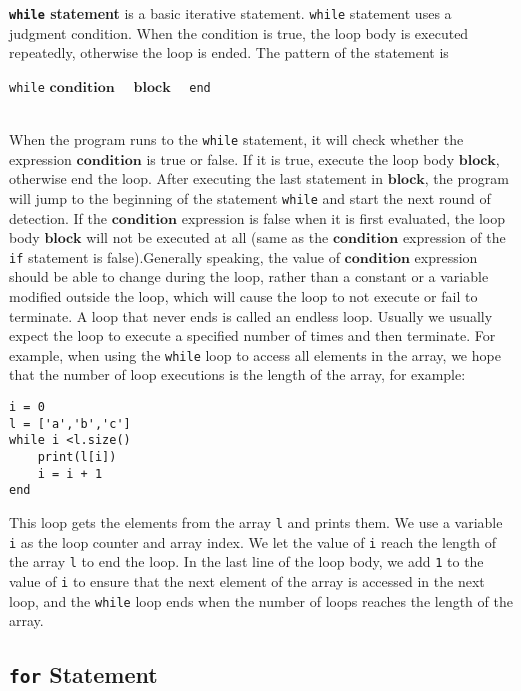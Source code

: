 \textbf{\texttt{while} statement} is a basic iterative statement. \texttt{while} statement uses a judgment condition. When the condition is true, the loop body is executed repeatedly, otherwise the loop is ended. The pattern of the statement is
\begin{algorithm}
    \texttt{while} $\bm{condition}$ \ \
        \qquad $\bm{block}$ \ \
    \texttt{end}
\end{algorithm}\vspace{-0.6em}\\
When the program runs to the \texttt{while} statement, it will check whether the expression $\bm{condition}$ is true or false. If it is true, execute the loop body $\bm{block}$, otherwise end the loop. After executing the last statement in $\bm{block}$, the program will jump to the beginning of the statement \texttt{while} and start the next round of detection. If the $\bm{condition}$ expression is false when it is first evaluated, the loop body $\bm{block}$ will not be executed at all (same as the $\bm{condition}$ expression of the \texttt{if} statement is false).Generally speaking, the value of $\bm{condition}$ expression should be able to change during the loop, rather than a constant or a variable modified outside the loop, which will cause the loop to not execute or fail to terminate. A loop that never ends is called an endless loop. Usually we usually expect the loop to execute a specified number of times and then terminate. For example, when using the \texttt{while} loop to access all elements in the array, we hope that the number of loop executions is the length of the array, for example:
\begin{lstlisting}[language=berry, numbers=none]
i = 0
l = ['a','b','c']
while i <l.size()
    print(l[i])
    i = i + 1
end
\end{lstlisting}
This loop gets the elements from the array \texttt{l} and prints them. We use a variable \texttt{i} as the loop counter and array index. We let the value of \texttt{i} reach the length of the array \texttt{l} to end the loop. In the last line of the loop body, we add \texttt{1} to the value of \texttt{i} to ensure that the next element of the array is accessed in the next loop, and the \texttt{while} loop ends when the number of loops reaches the length of the array.

\subsection{\texttt{for} Statement}

